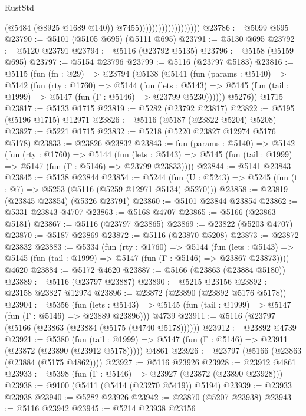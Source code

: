\begin{lexlean}{RustStd}
\begin{coremodule}
{\begin{coremodule}
{{{{{{{{{{{{{{{{{{{{{{{{{{{{{{{                                          (@5484 (@8925 @1689 @140))
                                          @7455)))))))))))))))))))
@23786 := @5099 @695
@23790 := @5101 (@5105 @695) (@5111 @695)
@23791 := @5130 @695
@23792 := @5120 @23791
@23794 := @5116 (@23792 @5135)
@23796 := @5158 (@5159 @695)
@23797 := @5154 @23796
@23799 := @5116 (@23797 @5183)
@23816 := @5115
    (fun (fn : @29) =>
    @23794
      (@5138
        (@5141
          (fun (params : @5140) =>
          @5142
            (fun (rty : @1760) =>
            @5144
              (fun (lets : @5143) =>
              @5145 (fun (tail : @1999) => @5147 (fun (Γ : @5146) => @23799 @5230))))))
        @5276))
    @1715
@23817 := @5133 @1715
@23819 := @5282 (@23792 @23817)
@23822 := @5195 (@5196 @1715) @12971
@23826 := @5116 (@5187 (@23822 @5204) @5208)
@23827 := @5221 @1715
@23832 := @5218 (@5220 @23827 @12974 @5176 @5178)
@23833 := @23826 @23832
@23843 := fun (params : @5140) =>
  @5142
    (fun (rty : @1760) =>
    @5144
      (fun (lets : @5143) =>
      @5145 (fun (tail : @1999) => @5147 (fun (Γ : @5146) => @23799 @23833))))
@23844 := @5141 @23843
@23845 := @5138 @23844
@23854 := @5244
    (fun (U : @5243) => @5245 (fun (t : @7) => @5253 (@5116 (@5259 @12971 @5134) @5270)))
@23858 := @23819 (@23845 @23854) (@5326 @23791)
@23860 := @5101 @23844 @23854
@23862 := @5331 @23843 @4707
@23863 := @5168 @4707
@23865 := @5166 (@23863 @5181)
@23867 := @5116 (@23797 @23865)
@23869 := @23822 (@5203 @4707)
@23870 := @5187 @23869
@23872 := @5116 (@23870 @5208)
@23873 := @23872 @23832
@23883 := @5334
    (fun (rty : @1760) =>
    @5144
      (fun (lets : @5143) =>
      @5145 (fun (tail : @1999) => @5147 (fun (Γ : @5146) => @23867 @23873))))
    @4620
@23884 := @5172 @4620
@23887 := @5166 (@23863 (@23884 @5180))
@23889 := @5116 (@23797 @23887)
@23890 := @5215 @23156
@23892 := @23158 @23827 @12974
@23896 := @23872 (@23890 (@23892 @5176 @5178))
@23904 := @5356
    (fun (lets : @5143) => @5145 (fun (tail : @1999) => @5147 (fun (Γ : @5146) => @23889 @23896)))
    @4739
@23911 := @5116 (@23797 (@5166 (@23863 (@23884 (@5175 (@4740 @5178))))))
@23912 := @23892 @4739
@23921 := @5380
    (fun (tail : @1999) => @5147 (fun (Γ : @5146) => @23911 (@23872 (@23890 (@23912 @5178)))))
    @4861
@23926 := @23797 (@5166 (@23863 (@23884 (@5175 @4862))))
@23927 := @5116 @23926
@23928 := @23912 @4861
@23933 := @5398 (fun (Γ : @5146) => @23927 (@23872 (@23890 @23928)))
@23938 := @9100 (@5411 (@5414 (@23270 @5419)) @5194)
@23939 := @23933 @23938
@23940 := @5282 @23926
@23942 := @23870 (@5207 @23938)
@23943 := @5116 @23942
@23945 := @5214 @23938 @23156
}}}}}}}}}}}}}}}}}}}}}}}}}}}}}}}
\end{coremodule}}
\end{coremodule}
\end{lexlean}
